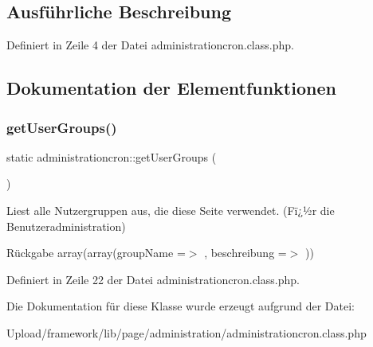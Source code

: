 \subsection{Ausführliche Beschreibung}


Definiert in Zeile 4 der Datei administrationcron.\+class.\+php.



\subsection{Dokumentation der Elementfunktionen}
\mbox{\label{classadministrationcron_a3b2d408b7433316b3dce0faa774c62c0}} 
\subsubsection{\texorpdfstring{get\+User\+Groups()}{getUserGroups()}}
{\footnotesize\ttfamily static administrationcron\+::get\+User\+Groups (\begin{DoxyParamCaption}{ }\end{DoxyParamCaption})\hspace{0.3cm}{\ttfamily [static]}}

Liest alle Nutzergruppen aus, die diese Seite verwendet. (Fï¿½r die Benutzeradministration) \begin{DoxyReturn}{Rückgabe}
array(array(\textquotesingle{}group\+Name\textquotesingle{} =$>$ \textquotesingle{}\textquotesingle{}, \textquotesingle{}beschreibung\textquotesingle{} =$>$ \textquotesingle{}\textquotesingle{})) 
\end{DoxyReturn}


Definiert in Zeile 22 der Datei administrationcron.\+class.\+php.



Die Dokumentation für diese Klasse wurde erzeugt aufgrund der Datei\+:\begin{DoxyCompactItemize}
\item 
Upload/framework/lib/page/administration/administrationcron.\+class.\+php\end{DoxyCompactItemize}

